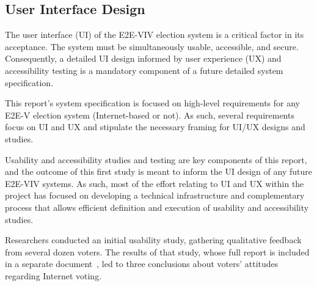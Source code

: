 \subsection{User Interface Design}
\label{sec:user-interf-design}

The user interface (UI) of the E2E-VIV election system is a critical
factor in its acceptance. The system must be simultaneously usable,
accessible, and secure. Consequently, a detailed UI design informed by
user experience (UX) and accessibility testing is a mandatory
component of a future detailed system specification.

This report’s system specification is focused on high-level
requirements for any E2E-V election system (Internet-based or not). As
such, several requirements focus on UI and UX and stipulate the
necessary framing for UI/UX designs and studies.

Usability and accessibility studies and testing are key components of
this report, and the outcome of this first study is meant to inform
the UI design of any future E2E-VIV systems. As such, most of the
effort relating to UI and UX within the project has focused on
developing a technical infrastructure and complementary process that
allows efficient definition and execution of usability and
accessibility studies.

Researchers conducted an initial usability study, gathering
qualitative feedback from several dozen voters. The results of that
study, whose full report is included in a separate
document~\cite{E2EVIVUsabilityStudy}, led to three conclusions about
voters’ attitudes regarding Internet voting.

